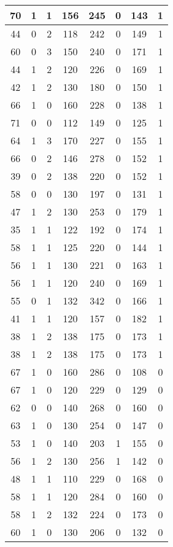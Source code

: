 \documentclass{article}
\begin{document}
\begin{longtable}{|c|c|c|c|c|c|c|c|}
70 & 1 & 1 & 156 & 245 & 0 & 143 & 1 \\ \hline
44 & 0 & 2 & 118 & 242 & 0 & 149 & 1 \\ \hline
60 & 0 & 3 & 150 & 240 & 0 & 171 & 1 \\ \hline
44 & 1 & 2 & 120 & 226 & 0 & 169 & 1 \\ \hline
42 & 1 & 2 & 130 & 180 & 0 & 150 & 1 \\ \hline
66 & 1 & 0 & 160 & 228 & 0 & 138 & 1 \\ \hline
71 & 0 & 0 & 112 & 149 & 0 & 125 & 1 \\ \hline
64 & 1 & 3 & 170 & 227 & 0 & 155 & 1 \\ \hline
66 & 0 & 2 & 146 & 278 & 0 & 152 & 1 \\ \hline
39 & 0 & 2 & 138 & 220 & 0 & 152 & 1 \\ \hline
58 & 0 & 0 & 130 & 197 & 0 & 131 & 1 \\ \hline
47 & 1 & 2 & 130 & 253 & 0 & 179 & 1 \\ \hline
35 & 1 & 1 & 122 & 192 & 0 & 174 & 1 \\ \hline
58 & 1 & 1 & 125 & 220 & 0 & 144 & 1 \\ \hline
56 & 1 & 1 & 130 & 221 & 0 & 163 & 1 \\ \hline
56 & 1 & 1 & 120 & 240 & 0 & 169 & 1 \\ \hline
55 & 0 & 1 & 132 & 342 & 0 & 166 & 1 \\ \hline
41 & 1 & 1 & 120 & 157 & 0 & 182 & 1 \\ \hline
38 & 1 & 2 & 138 & 175 & 0 & 173 & 1 \\ \hline
38 & 1 & 2 & 138 & 175 & 0 & 173 & 1 \\ \hline
67 & 1 & 0 & 160 & 286 & 0 & 108 & 0 \\ \hline
67 & 1 & 0 & 120 & 229 & 0 & 129 & 0 \\ \hline
62 & 0 & 0 & 140 & 268 & 0 & 160 & 0 \\ \hline
63 & 1 & 0 & 130 & 254 & 0 & 147 & 0 \\ \hline
53 & 1 & 0 & 140 & 203 & 1 & 155 & 0 \\ \hline
56 & 1 & 2 & 130 & 256 & 1 & 142 & 0 \\ \hline
48 & 1 & 1 & 110 & 229 & 0 & 168 & 0 \\ \hline
58 & 1 & 1 & 120 & 284 & 0 & 160 & 0 \\ \hline
58 & 1 & 2 & 132 & 224 & 0 & 173 & 0 \\ \hline
60 & 1 & 0 & 130 & 206 & 0 & 132 & 0 \\ \hline

\end{longtable}
\end{document}
